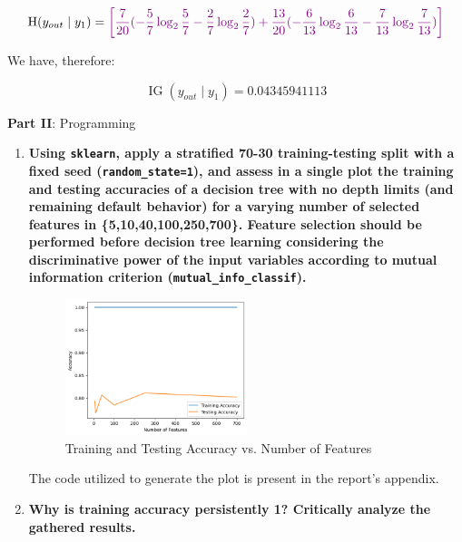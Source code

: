 \documentclass[12pt]{article}
\begin{document}
\begin{enumerate}[leftmargin=\labelsep]
\begin{equation}
  \operatorname{H}(y_{out} \mid y_1) = \textcolor{violet}{\left[\frac{7}{20}(- {\frac{5}{7}} \log_2 \frac{5}{7} - \frac{2}{7} \log_2 \frac{2}{7}) + \frac{13}{20}(- \frac{6}{13} \log_2 \frac{6}{13} - \frac{7}{13} \log_2 \frac{7}{13})\right]}
\end{equation}

        We have, therefore:

        $$
          \operatorname{IG}(y_{out} \mid y_1) = 0.04345941113
        $$

\end{enumerate}

\center\large{\textbf{Part II}: Programming}

\begin{enumerate}[leftmargin=\labelsep,resume]
  \item \textbf{Using \texttt{sklearn}, apply a stratified 70-30 training-testing split with a fixed seed (\texttt{random\_state=1}), and assess in a single plot the training and testing accuracies of a decision tree with no depth limits (and remaining default behavior) for a varying number of selected features in \{5,10,40,100,250,700\}. Feature selection should be performed before decision tree learning considering the discriminative power of the input variables according to mutual information criterion (\texttt{mutual\_info\_classif}).}

        \begin{figure}[htpb]
          \centering
          \includegraphics[width=0.5\textwidth]{../assets/hw1-2.1.png}
          \caption{Training and Testing Accuracy vs. Number of Features}
        \end{figure}

        The code utilized to generate the plot is present in the report's appendix.

  \item \textbf{Why is training accuracy persistently 1? Critically analyze the gathered results.}


\end{enumerate}
\end{document}
